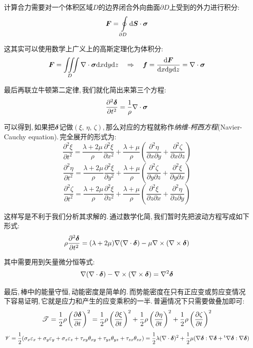 计算合力需要对一个体积区域$D$的边界闭合外向曲面$\partial D$上受到的外力进行积分:
\[\boldsymbol{F}=\oint\limits_{\partial D}\textrm{d}\boldsymbol{S}\cdot\boldsymbol{\sigma}\]

这其实可以使用数学上广义上的高斯定理化为体积分:
\[\boldsymbol{F}=\iiint\limits_{D}\nabla\cdot\boldsymbol{\sigma}\textrm{d} x\textrm{d} y\textrm{d} z\quad\Rightarrow \quad \boldsymbol{f}=\frac{\textrm{d}\boldsymbol{F}}{\textrm{d} x\textrm{d} y\textrm{d} z}=\nabla\cdot\boldsymbol{\sigma}\]

最后再联立牛顿第二定律,\,我们就化简出来第三个方程:
\[\frac{\partial^2 \boldsymbol{\delta}}{\partial t^2}=\frac{1}{\rho}\nabla\cdot\boldsymbol{\sigma}\]

可以得到,\,如果把$\boldsymbol{\delta}$记做$(\xi,\,\eta,\,\zeta)$,\,那么对应的方程就称作\emph{纳维-柯西方程}(Navier-Cauchy equation).\,完全展开的形式为:
\[\frac{\partial^2 \xi}{\partial t^2}=\frac{\lambda+2\mu}{\rho}\frac{\partial^2 \xi}{\partial x^2}+\frac{\lambda+\mu}{\rho}\left(\frac{\partial^2 \eta}{\partial x\partial y}+\frac{\partial^2 \zeta}{\partial x\partial z}\right)\]
\[\frac{\partial^2 \eta}{\partial t^2}=\frac{\lambda+2\mu}{\rho}\frac{\partial^2 \xi}{\partial y^2}+\frac{\lambda+\mu}{\rho}\left(\frac{\partial^2 \zeta}{\partial y\partial z}+\frac{\partial^2 \xi}{\partial y\partial x}\right)\]
\[\frac{\partial^2 \zeta}{\partial t^2}=\frac{\lambda+2\mu}{\rho}\frac{\partial^2 \xi}{\partial z^2}+\frac{\lambda+\mu}{\rho}\left(\frac{\partial^2 \xi}{\partial z\partial x}+\frac{\partial^2 \eta}{\partial z\partial y}\right)\]

这样写是不利于我们分析其求解的.\,通过数学化简,\,我们暂时先把波动方程写成如下形式:
\[\rho\frac{\partial^2 \boldsymbol{\delta}}{\partial t^2}=(\lambda+2\mu)\nabla(\nabla\cdot \boldsymbol{\delta})-\mu\nabla\times(\nabla\times\boldsymbol{\delta})\]

其中需要用到矢量微分恒等式:
\[\nabla(\nabla\cdot \boldsymbol{\delta})-\nabla\times(\nabla\times\boldsymbol{\delta})=\nabla^2\boldsymbol{\delta}\]

最后,\,棒中的能量守恒,\,动能密度是简单的.\,而势能密度在只有正应变或剪应变情况下容易证明,\,它就是应力和产生的应变乘积的一半.\,普遍情况下只需要做叠加即可:
\[\mathscr{T}=\frac{1}{2}\rho\left(\frac{\partial \boldsymbol{\delta}}{\partial t}\right)^2=\frac{1}{2}\rho\left(\frac{\partial \xi}{\partial t}\right)^2+\frac{1}{2}\rho\left(\frac{\partial \eta}{\partial t}\right)^2+\frac{1}{2}\rho\left(\frac{\partial \zeta}{\partial t}\right)^2\]
\[\mathscr{V}=\frac{1}{2}(\sigma_x\varepsilon_x+\sigma_y\varepsilon_y+\sigma_z\varepsilon_z+\tau_{xy}\theta_{xy}+\tau_{yz}\theta_{yz}+\tau_{zx}\theta_{zx})=\frac{1}{2}\lambda(\nabla\cdot\boldsymbol{\delta})^2+\frac{1}{2}\mu(\nabla\boldsymbol{\delta}:\nabla\boldsymbol{\delta}+\phantom{}^{\rm t}\nabla\boldsymbol{\delta}:\nabla\boldsymbol{\delta})\]

